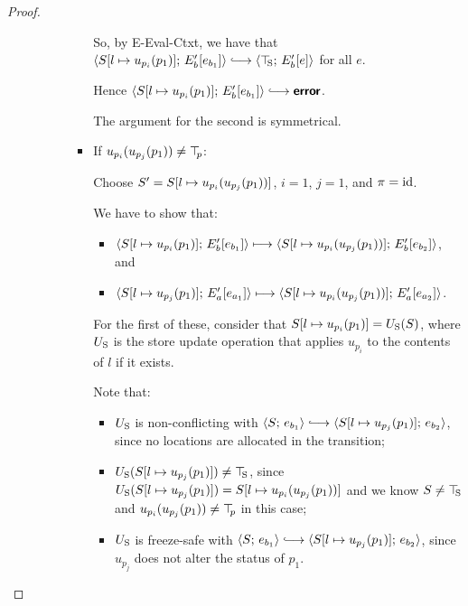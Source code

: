 \begin{proof}
\begin{enumerate}
\begin{enumerate}
\begin{itemize}
\begin{itemize}
          So, by {\sc E-Eval-Ctxt}, we have that
          $\config{\extSRaw{S}{l}{u_{p_i}(p_1)}}{\evalctxt{E'_b}{e_{b_1}}}
          \parstepsto \config{\topS}{\evalctxt{E'_b}{e}}$ for all $e$.

          Hence
          $\config{\extSRaw{S}{l}{u_{p_i}(p_1)}}{\evalctxt{E'_b}{e_{b_1}}}
          \parstepsto \error$.

          The argument for the second is symmetrical.

        \item If $u_{p_i}(u_{p_j}(p_1)) \neq \top\hspace{-0.85mm}_{p}$:

          Choose $S' = S[l \mapsto u_{p_i}(u_{p_j}(p_1))]$, $i =
          1$, $j = 1$, and $\pi = \mathrm{id}$.

          We have to show that:
          \begin{itemize}
          \item
            $\langle S[l \mapsto u_{p_i}(p_1)];\, E'_b\hspace{-0.5mm}\left[e_{b_1}\right] \rangle
            \longmapsto
            \langle S[l \mapsto u_{p_i}(u_{p_j}(p_1))];\, E'_b\hspace{-0.5mm}\left[e_{b_2}\right] \rangle$,
            and
          \item
            $\langle S[l \mapsto u_{p_j}(p_1)];\, E'_a\hspace{-0.5mm}\left[e_{a_1}\right] \rangle
            \longmapsto
            \langle S[l \mapsto u_{p_i}(u_{p_j}(p_1))];\, E'_a\hspace{-0.5mm}\left[e_{a_2}\right] \rangle$.
          \end{itemize}

          For the first of these, consider that
          $S[l \mapsto u_{p_i}(p_1)] = U_{\mathrm{S}}(S)$, where $U_{\mathrm{S}}$ is the
          store update operation that applies $u_{p_i}$ to the
          contents of $l$ if it exists.

          Note that:
          \begin{itemize}
          \item $U_{\mathrm{S}}$ is non-conflicting with $\config{S}{e_{b_1}}
            \parstepsto
            \config{\extSRaw{S}{l}{u_{p_j}(p_1)}}{e_{b_2}}$, since no
            locations are allocated in the transition;
          \item $U_{\mathrm{S}}(S[l \mapsto u_{p_j}(p_1)]) \neq \top\hspace{-0.85mm}_{\mathrm{S}}$, since
            $U_{\mathrm{S}}(S[l \mapsto u_{p_j}(p_1)]) =
            S[l \mapsto u_{p_i}(u_{p_j}(p_1))]$ and we know $S \neq
            \top\hspace{-0.85mm}_{\mathrm{S}}$ and $u_{p_i}(u_{p_j}(p_1)) \neq \top\hspace{-0.85mm}_{p}$ in this
            case;
          \item $U_{\mathrm{S}}$ is freeze-safe with $\config{S}{e_{b_1}}
            \parstepsto
            \config{\extSRaw{S}{l}{u_{p_j}(p_1)}}{e_{b_2}}$, since
            $u_{p_j}$ does not alter the status of $p_1$.


\end{itemize}
\end{itemize}
\end{itemize}
\end{enumerate}
\end{enumerate}
\end{proof}

